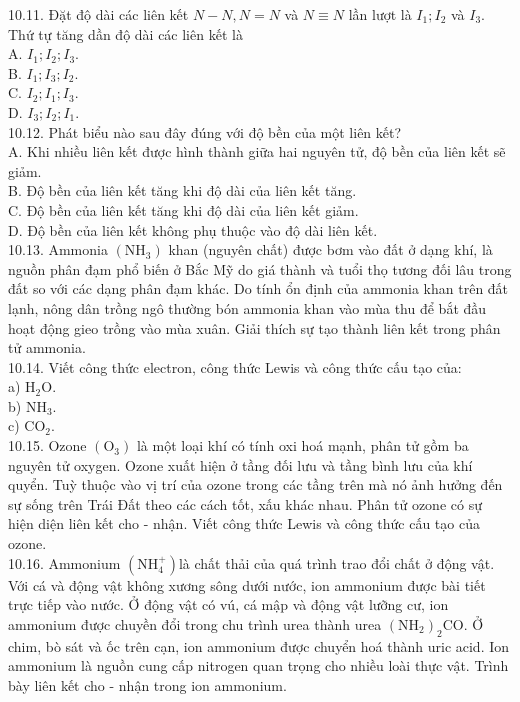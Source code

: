 \documentclass[10pt]{article}
\begin{document}
10.11. Đặt độ dài các liên kết $N-N, N=N$ và $N \equiv N$ lần lượt là $I_{1} ; I_{2}$ và $I_{3}$. Thứ tự tăng dần độ dài các liên kết là\\
A. $I_{1} ; I_{2} ; I_{3}$.\\
B. $I_{1} ; I_{3} ; I_{2}$.\\
C. $I_{2} ; I_{1} ; I_{3}$.\\
D. $I_{3} ; I_{2} ; I_{1}$.\\
10.12. Phát biểu nào sau đây đúng với độ bền của một liên kết?\\
A. Khi nhiều liên kết được hình thành giữa hai nguyên tử, độ bền của liên kết sẽ giảm.\\
B. Độ bền của liên kết tăng khi độ dài của liên kết tăng.\\
C. Độ bền của liên kết tăng khi độ dài của liên kết giảm.\\
D. Độ bền của liên kết không phụ thuộc vào độ dài liên kết.\\
10.13. Ammonia $\left(\mathrm{NH}_{3}\right)$ khan (nguyên chất) được bơm vào đất ở dạng khí, là nguồn phân đạm phổ biến ở Bắc Mỹ do giá thành và tuổi thọ tương đối lâu trong đất so với các dạng phân đạm khác. Do tính ổn định của ammonia khan trên đất lạnh, nông dân trồng ngô thường bón ammonia khan vào mùa thu để bắt đầu hoạt động gieo trồng vào mùa xuân. Giải thích sự tạo thành liên kết trong phân tử ammonia.\\
10.14. Viết công thức electron, công thức Lewis và công thức cấu tạo của:\\
a) $\mathrm{H}_{2} \mathrm{O}$.\\
b) $\mathrm{NH}_{3}$.\\
c) $\mathrm{CO}_{2}$.\\
10.15. Ozone $\left(\mathrm{O}_{3}\right)$ là một loại khí có tính oxi hoá mạnh, phân tử gồm ba nguyên tử oxygen. Ozone xuất hiện ở tầng đối lưu và tầng bình lưu của khí quyển. Tuỳ thuộc vào vị trí của ozone trong các tầng trên mà nó ảnh hưởng đến sự sống trên Trái Đất theo các cách tốt, xấu khác nhau. Phân tử ozone có sự hiện diện liên kết cho - nhận. Viết công thức Lewis và công thức cấu tạo của ozone.\\
10.16. Ammonium $\left(\mathrm{NH}_{4}^{+}\right)$là chất thải của quá trình trao đổi chất ở động vật. Với cá và động vật không xương sông dưới nước, ion ammonium được bài tiết trực tiếp vào nước. Ở động vật có vú, cá mập và động vật lưỡng cư, ion ammonium được chuyền đổi trong chu trình urea thành urea $\left(\mathrm{NH}_{2}\right)_{2} \mathrm{CO}$. Ở chim, bò sát và ốc trên cạn, ion ammonium được chuyển hoá thành uric acid. Ion ammonium là nguồn cung cấp nitrogen quan trọng cho nhiều loài thực vật. Trình bày liên kết cho - nhận trong ion ammonium.\\
\end{document}
